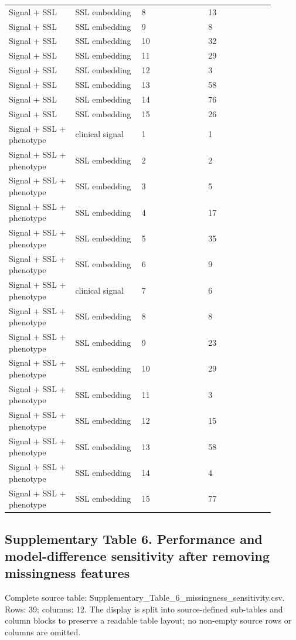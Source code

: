 \documentclass[utf8]{frontiers_suppmat}
\begin{document}
\begin{landscape}
\begin{longtable}{L{0.225\linewidth} L{0.225\linewidth} L{0.225\linewidth} L{0.225\linewidth}}
Signal + SSL & SSL embedding & 8 & 13 \\
Signal + SSL & SSL embedding & 9 & 8 \\
Signal + SSL & SSL embedding & 10 & 32 \\
Signal + SSL & SSL embedding & 11 & 29 \\
Signal + SSL & SSL embedding & 12 & 3 \\
Signal + SSL & SSL embedding & 13 & 58 \\
Signal + SSL & SSL embedding & 14 & 76 \\
Signal + SSL & SSL embedding & 15 & 26 \\
Signal + SSL + phenotype & clinical signal & 1 & 1 \\
Signal + SSL + phenotype & SSL embedding & 2 & 2 \\
Signal + SSL + phenotype & SSL embedding & 3 & 5 \\
Signal + SSL + phenotype & SSL embedding & 4 & 17 \\
Signal + SSL + phenotype & SSL embedding & 5 & 35 \\
Signal + SSL + phenotype & SSL embedding & 6 & 9 \\
Signal + SSL + phenotype & clinical signal & 7 & 6 \\
Signal + SSL + phenotype & SSL embedding & 8 & 8 \\
Signal + SSL + phenotype & SSL embedding & 9 & 23 \\
Signal + SSL + phenotype & SSL embedding & 10 & 29 \\
Signal + SSL + phenotype & SSL embedding & 11 & 3 \\
Signal + SSL + phenotype & SSL embedding & 12 & 15 \\
Signal + SSL + phenotype & SSL embedding & 13 & 58 \\
Signal + SSL + phenotype & SSL embedding & 14 & 4 \\
Signal + SSL + phenotype & SSL embedding & 15 & 77 \\
\end{longtable}
\normalsize
\end{landscape}


\clearpage

\subsection*{Supplementary Table 6. Performance and model-difference sensitivity after removing missingness features}

Complete source table: Supplementary\_\allowbreak{}Table\_\allowbreak{}6\_\allowbreak{}missingness\_\allowbreak{}sensitivity.\allowbreak{}csv. Rows: 39; columns: 12. The display is split into source-defined sub-tables and column blocks to preserve a readable table layout; no non-empty source rows or columns are omitted.
\end{document}
